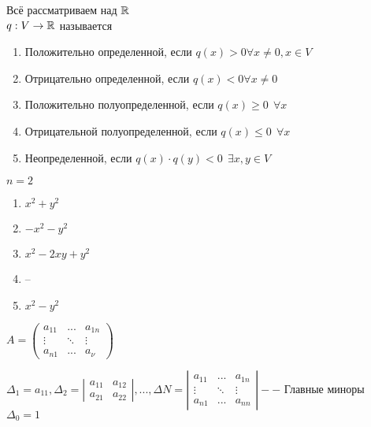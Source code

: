 \begin{Def} 
	Всё рассматриваем над $\mathbb{R}$\\
	$q: V \to \mathbb{R}$ называется 
	\begin{enumerate}
		\item Положительно определенной, если $q(x) > 0 \forall x \neq 0, x \in V$
		\item Отрицательно определенной, если $q(x) < 0 \forall x \neq 0$
		\item Положительно полуопределенной, если $q(x) \geqslant 0 \ \ \forall x$
		\item Отрицательной полуопределенной, если $q(x) \leqslant 0 \ \ \forall x$
		\item Неопределенной, если $q(x) \cdot q(y) < 0 \ \ \exists x, y \in V$
	\end{enumerate}
\end{Def} 

\begin{Example}
	$n = 2$
	\begin{enumerate}
		\item $x^2 + y^2$
		\item $-x^2 - y^2$
		\item $x^2 - 2xy + y^2$
		\item --
		\item $x^2 - y^2$
	\end{enumerate}	
\end{Example}


\begin{Def} 
	$A = \left(
		\begin{array}{cccc}
			a_{11} & ... &  a_{1n}\\
			\vdots & \ddots & \vdots\\
			a_{n1} & ... & a_{\nu}
		\end{array}
	\right)$

	$\Delta_1 = a_{11}, \Delta_2 = \left| \begin{array}{cc}
		a_{11} & a_{12}\\
		a_{21} & a_{22}
	\end{array} \right|, ..., \Delta N = \left| \begin{array}{ccc}
		a_{11} & ... & a_{1n}\\
		\vdots & \ddots & \vdots\\
		a_{n1} & ... & a_{nn}
	\end{array} \right| --$ Главные миноры\\
	$\Delta_0 = 1$
\end{Def} 

